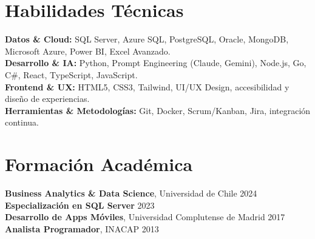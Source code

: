 \documentclass[11pt,letterpaper]{article}
\begin{document}
\section{Habilidades T\'{e}cnicas}
\textbf{Datos \& Cloud:} SQL Server, Azure SQL, PostgreSQL, Oracle, MongoDB, Microsoft Azure, Power BI, Excel Avanzado.\\
\textbf{Desarrollo \& IA:} Python, Prompt Engineering (Claude, Gemini), Node.js, Go, C#, React, TypeScript, JavaScript.\\
\textbf{Frontend \& UX:} HTML5, CSS3, Tailwind, UI/UX Design, accesibilidad y diseño de experiencias.\\
\textbf{Herramientas \& Metodolog\'{i}as:} Git, Docker, Scrum/Kanban, Jira, integraci\'{o}n continua.

\section{Formaci\'{o}n Acad\'{e}mica}
\textbf{Business Analytics \& Data Science}, Universidad de Chile \hfill 2024\\
\textbf{Especializaci\'{o}n en SQL Server} \hfill 2023\\
\textbf{Desarrollo de Apps M\'{o}viles}, Universidad Complutense de Madrid \hfill 2017\\
\textbf{Analista Programador}, INACAP \hfill 2013
\end{document}
